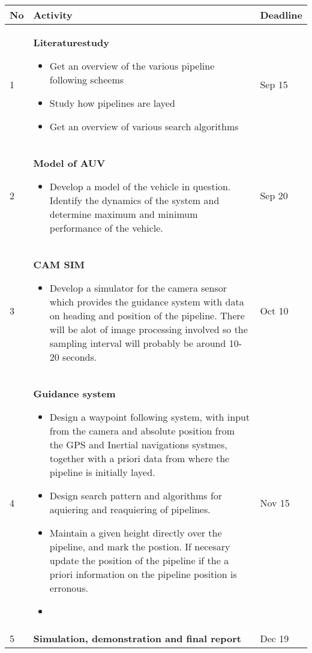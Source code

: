 \documentclass[a4paper,10pt]{article}
\begin{document}
	\begin{tabular}{|p{0.5cm} p{8.5cm}|p{1.5cm}|}
	\hline
	No 	&	Activity	&	Deadline \\
	\hline
	1	&	\textbf{Literaturestudy} 	\begin{itemize}
	 	 					\item Get an overview of the various pipeline following scheems
	 	 					\item Study how pipelines are layed
	 	 					\item Get an overview of various search algorithms
	 	 				\end{itemize}	
								& 	Sep 15\\
	\hline
	2	&	\textbf{Model of AUV}	\begin{itemize}
	 	 	            		 \item Develop a model of the vehicle in question. Identify the dynamics of the system and determine maximum and minimum performance of the vehicle.
	 	 	            		\end{itemize}
								&	Sep 20\\
	\hline
	3	&	\textbf{CAM SIM}	\begin{itemize}
	 	 	       			 \item Develop a simulator for the camera sensor which provides the guidance system with data on heading and position of the pipeline. There will be alot of image processing involved so the sampling interval will probably be around 10-20 seconds.
	 	 	       			\end{itemize}
								&	Oct 10 \\
	\hline
	4	&	\textbf{Guidance system}\begin{itemize}
	 	 	               		 \item Design a waypoint following system, with input from the camera and absolute position from the GPS and Inertial navigations systmes, together with a priori data from where the pipeline is initially layed. 
	 	 	               		 \item Design search pattern and algorithms for aquiering and reaquiering of pipelines. 
	 	 	               		 \item Maintain a given height directly over the pipeline, and mark the postion. If necesary update the position of the pipeline if the a priori information on the pipeline position is erronous. 
	 	 	               		 \item 
	 	 	               		\end{itemize}
								&	Nov 15 \\
	\hline
	5	&	\textbf{Simulation, demonstration and final report}	&	Dec 19 \\
	\hline
	\end{tabular}
\end{document}
